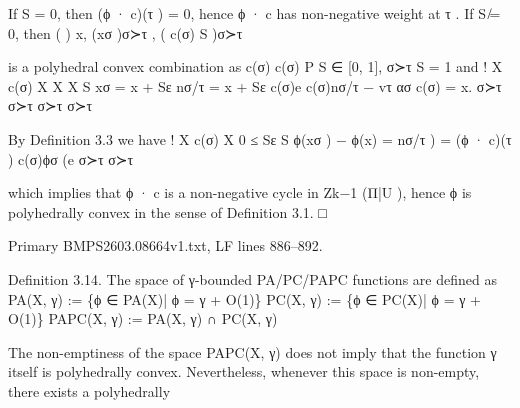\documentclass[
  11pt,
]{article}
\newenvironment{Shaded}{}{}
\newcommand{\NormalTok}[1]{#1}
\begin{document}
\begin{Shaded}
\begin{Highlighting}[]
\NormalTok{If S = 0, then (ϕ · c)(τ ) = 0, hence ϕ · c has non{-}negative weight at τ . If S ̸= 0, then}
\NormalTok{                                        (                            )}
\NormalTok{                                           x, (xσ )σ≻τ , ( c(σ)}
\NormalTok{                                                            S   )σ≻τ}


\NormalTok{is a polyhedral convex combination as c(σ)                                 c(σ)}
\NormalTok{                                                                  P}
\NormalTok{                                       S ∈ [0, 1],                  σ≻τ     S = 1 and}
\NormalTok{                                                                                                       !}
\NormalTok{          X c(σ)                     X                             X                     X}
\NormalTok{                S   xσ = x + Sε               nσ/τ = x + Sε}
\NormalTok{                                          c(σ)e                          c(σ)nσ/τ − vτ         ασ c(σ)     = x.}
\NormalTok{          σ≻τ                       σ≻τ                            σ≻τ                   σ≻τ}

\NormalTok{By Definition 3.3 we have}
\NormalTok{                                                          !}
\NormalTok{                               X c(σ)                             X}
\NormalTok{                     0 ≤ Sε           S   ϕ(xσ ) − ϕ(x)       =                 nσ/τ ) = (ϕ · c)(τ )}
\NormalTok{                                                                        c(σ)ϕσ (e}
\NormalTok{                               σ≻τ                                σ≻τ}

\NormalTok{which implies that ϕ · c is a non{-}negative cycle in Zk−1 (Π|U ), hence ϕ is polyhedrally convex in the}
\NormalTok{sense of Definition 3.1.                                                                            □}
\end{Highlighting}
\end{Shaded}

Primary BMPS2603.08664v1.txt, LF lines 886--892.

\begin{Shaded}
\begin{Highlighting}[]
\NormalTok{Definition 3.14. The space of γ{-}bounded PA/PC/PAPC functions are defined as}
\NormalTok{                              PA(X, γ) := \{ϕ ∈ PA(X)| ϕ = γ + O(1)\}}
\NormalTok{                              PC(X, γ) := \{ϕ ∈ PC(X)| ϕ = γ + O(1)\}}
\NormalTok{                              PAPC(X, γ) := PA(X, γ) ∩ PC(X, γ)}

\NormalTok{   The non{-}emptiness of the space PAPC(X, γ) does not imply that the function γ itself is}
\NormalTok{polyhedrally convex. Nevertheless, whenever this space is non{-}empty, there exists a polyhedrally}
\end{Highlighting}
\end{Shaded}
\end{document}
